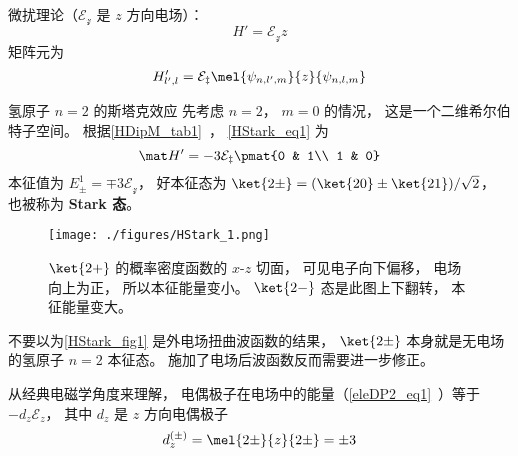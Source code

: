 
\begin{issues}
\issueDraft
\end{issues}


微扰理论（$\mathcal{E_z}$ 是 $z$ 方向电场）：
\begin{equation}
H' = \mathcal{E_z} z
\end{equation}
矩阵元为
\begin{equation}\label{HStark_eq1}
H'_{l',l} = \mathcal{E_z}\mel{\psi_{n,l',m}}{z}{\psi_{n,l,m}}
\end{equation}


\begin{example}{氢原子 $n=2$ 的斯塔克效应}
先考虑 $n=2$， $m=0$ 的情况， 这是一个二维希尔伯特子空间。 根据\autoref{HDipM_tab1}~， \autoref{HStark_eq1} 为
\begin{equation}
\mat H' = -3\mathcal{E_z}\pmat{0 & 1\\ 1 & 0}
\end{equation}
本征值为 $E_{\pm}^1 = \mp 3\mathcal{E_z}$， 好本征态为 $\ket{2\pm} = (\ket{20} \pm \ket{21})/{\sqrt 2}$， 也被称为 \textbf{Stark 态}。

\begin{figure}[ht]
\centering
\texttt{[image: ./figures/HStark\_1.png]}
\caption{$\ket{2+}$ 的概率密度函数的 $x$-$z$ 切面， 可见电子向下偏移， 电场向上为正， 所以本征能量变小。 $\ket{2-}$ 态是此图上下翻转， 本征能量变大。} \label{HStark_fig1}
\end{figure}

不要以为\autoref{HStark_fig1} 是外电场扭曲波函数的结果， $\ket{2\pm}$ 本身就是无电场的氢原子 $n=2$ 本征态。 施加了电场后波函数反而需要进一步修正。

从经典电磁学角度来理解， 电偶极子在电场中的能量（\autoref{eleDP2_eq1}~）等于 $-d_z \mathcal{E}_z$， 其中 $d_z$ 是 $z$ 方向电偶极子
\begin{equation}
d_z^{(\pm)} = \mel{2\pm}{z}{2\pm} = \pm 3
\end{equation}
\end{example}

